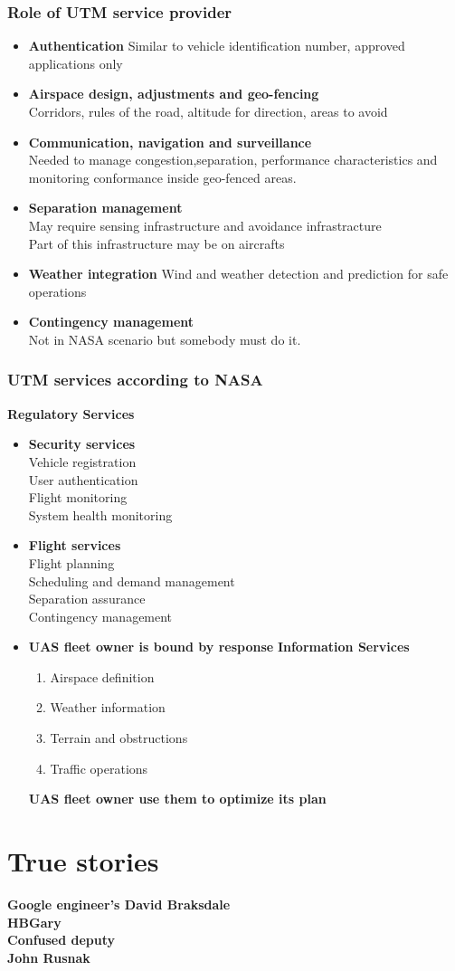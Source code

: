 \documentclass[10pt,a4paper]{book}
\begin{document}
\subsection{Role of UTM service provider}
\begin{itemize}
\item \textbf{Authentication}
Similar to vehicle identification number, approved applications only
\item \textbf{Airspace design, adjustments and geo-fencing}\\
Corridors, rules of the road, altitude for direction, areas to avoid
\item \textbf{Communication, navigation and surveillance}\\
Needed to manage congestion,separation, performance characteristics and monitoring conformance inside geo-fenced areas.
\item \textbf{Separation management}\\
May require sensing infrastructure and avoidance infrastracture\\
Part of this infrastructure may be on aircrafts
\item \textbf{Weather integration}
Wind and weather detection and prediction for safe operations
\item \textbf{Contingency management}\\
Not in NASA scenario but somebody must do it.
\end{itemize}

\subsection{UTM services according to NASA}

\textbf{Regulatory Services}
\begin{itemize}
\item \textbf{Security services}\\
Vehicle registration\\
User authentication\\
Flight monitoring\\
System health monitoring
\item \textbf{Flight services}\\
Flight planning\\
Scheduling and demand management\\
Separation assurance\\
Contingency management
\item \textbf{UAS fleet owner is bound by response}
\textbf{Information Services}
\begin{enumerate}
\item Airspace definition
\item Weather information
\item Terrain and obstructions
\item Traffic operations
\end{enumerate}
\textbf{UAS fleet owner use them to optimize its plan}
\end{itemize}
\chapter{True stories}
\textbf{Google engineer's David Braksdale}\\
\textbf{HBGary}\\
\textbf{Confused deputy}\\
\textbf{John Rusnak}\\
\end{document}
